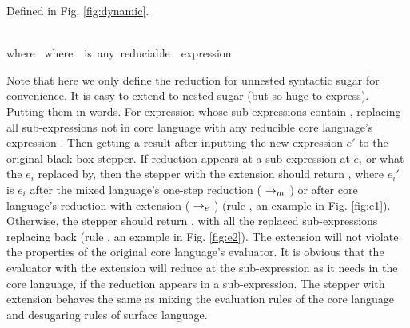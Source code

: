 \begin{Def} Defined in Fig.  \ref{fig:dynamic}. 
\end{Def}
\begin{figure*}[t]
{}
{\\where~}
{}
\scriptsize{where~~is~any~reduciable~~expression}
\caption{Dynamic Reduction}
\label{fig:dynamic}
\end{figure*}
Note that here we only define the reduction for unnested syntactic sugar for convenience. It is easy to extend to nested sugar (but so huge to express). Putting them in words. For expression  whose sub-expressions contain , replacing all  sub-expressions not in core language with any reducible core language's expression . Then getting a result after inputting the new expression $e'$ to the original black-box stepper. If reduction appears at a sub-expression at $e_i$ or what the $e_i$ replaced by, then the stepper with the extension should return , where $e_i'$ is $e_i$ after the mixed language's one-step reduction ($~\rightarrow_m~$) or after core language's reduction with extension ($~\rightarrow_e~$) (rule , an example in Fig.  \ref{fig:e1}). Otherwise, the stepper should return , with all the replaced sub-expressions replacing back (rule , an example in Fig.  \ref{fig:e2}). The extension will not violate the properties of the original core language's evaluator. It is obvious that the evaluator with the extension will reduce at the sub-expression as it needs in the core language, if the reduction appears in a sub-expression. The stepper with extension behaves the same as mixing the evaluation rules of the core language and desugaring rules of surface language.

